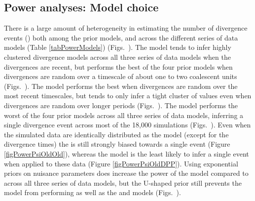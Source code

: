 \subsection*{Power analyses: Model choice}
There is a large amount of heterogeneity in estimating the number of divergence
events (\divTimeNum) both among the prior models, and across the different
series of data models (Table \ref{tabPowerModels}) (Figs.\
).
The \modelDPP model tends to infer highly clustered divergence models across
all three series of data models when the divergences are recent, but performs
the best of the four prior models  when divergences are random over a timescale
of about one to two coalescent units (Figs.\
).
The \modelUniform model performs the best when divergences are random
over the most recent timescales, but tends to only infer a tight
cluster of \divTimeNum values even when divergences are random
over longer periods (Figs.\
).
The \modelOld model performs the worst of the four prior models across
all three series of data models, inferring a single divergence event across
most of the 18,000 simulations (Figs.\
).
Even when the simulated data are identically distributed as the \modelOld model
(except for the divergence times) the \modelOld is still strongly biased
towards a single event (Figure \ref{figPowerPsiOldOld}), whereas the \modelDPP
model is the least likely to infer a single event when applied to these data
(Figure \ref{figPowerPsiOldDPP}).
Using exponential priors on nuisance parameters does increase the power
of the \modelUshaped model compared to \modelOld across all three series
of data models, but the U-shaped prior still prevents the model
from performing as well as the \modelDPP and \modelUniform models (Figs.\
).

